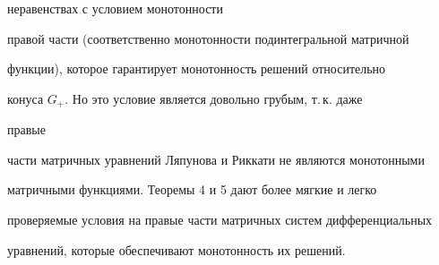 неравенствах с условием монотонности 


правой части (соответственно монотонности подинтегральной матричной 


функции), которое гарантирует монотонность решений относительно 


конуса $G_+$. Но это условие является довольно грубым, т.\,к. даже 


правые 


части матричных уравнений Ляпунова и Риккати не являются монотонными 


матричными функциями. Теоремы 4 и 5 дают более мягкие и легко 


проверяемые условия на правые части матричных систем дифференциальных 


уравнений, которые обеспечивают монотонность их решений. 


 


